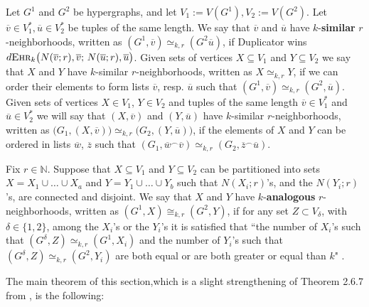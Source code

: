 \documentclass[12pt,notitlepage,a4paper]{article}
\theoremstyle{definition}
\newcommand{\N}{\mathbb{N}}
\newcommand{\ehr}{\textsc{Ehr}}
\begin{document}
Let $G^1$ and $G^2$ be hypergraphs, and let
$V_1:=V(G^1), V_2:=V(G^2)$.
Let $\overline{v} \in V_1^*, 
\overline{u} \in V_2^*$ be tuples of the same length.
We say that $\overline{v}$ and $\overline{u}$ have
$k$-\textbf{similar} $r$-neighborhoods, written as
$(G^1,\overline{v})\simeq_{k,r}(G^2 \overline{u})$, if Duplicator wins
$d\ehr_k\big(N(\overline{v};r),
\overline{v};\, N(\overline{u};r),\overline{u}\big)$.
Given sets of vertices $X\subseteq V_1$ and $Y\subseteq V_2$
we say that $X$ and $Y$ have $k$-similar
$r$-neighborhoods, written as
$X\simeq_{k,r} Y$, if we can order their elements to form
lists $\overline{v}$, resp. $\overline{u}$ such that 
$(G^1,\overline{v})\simeq_{k,r}(G^2,\overline{u})$. 
Given sets of vertices $X\in V_1$, $Y\in V_2$ and 
tuples of the same length $\overline{v}\in V_1^*$ and
$\overline{u}\in V_2^*$ we will say that $(X,\overline{v})$ 
and $(Y,\overline{u})$ have $k$-similar $r$-neighborhoods,
written as $\big(G_1, (X,\overline{v})  \big)
\simeq_{k,r} \big(G_2, (Y,\overline{u})  \big)$, if
the elements of $X$ and $Y$ can be ordered in lists
$\overline{w}$, $\overline{z}$ such that
$(G_1,\overline{w}^\smallfrown \overline{v})
\simeq_{k,r} (G_2,\overline{z}^\smallfrown \overline{u})$. \par
Fix $r\in \N$. Suppose that $X\subseteq V_1$ and 
$Y\subseteq V_2$ can
be partitioned into sets $X=X_1\cup \dots \cup X_a$
and $Y=Y_1\cup \dots \cup Y_b$ 
such that $N(X_i;r)$'s, and the
$N(Y_i;r)$'s, are connected and disjoint. 
We say that $X$ and
$Y$ have $k$-\textbf{analogous} $r$-neighborhoods,
written as $(G^1,X)\cong_{k,r} (G^2,Y)$, 
if for any set $Z\subset V_\delta$, with $\delta\in \{1,2\}$,
among the $X_i$'s or the $Y_i$'s
it is satisfied that ``the number of $X_i$'s  
such that $(G^\delta, Z) \simeq_{k,r} (G^1,X_i)$ 
and the number of $Y_i$'s such that
$(G^\delta,Z)\simeq_{k,r} (G^2,Y_i)$
are both equal or are both greater 
or equal than $k$" .

The main theorem of this section,which
is a slight strengthening of Theorem 
2.6.7 from \cite{spencer2013strange}, is the following:
\end{document}
